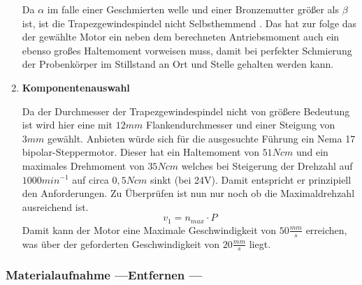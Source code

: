 \begin{enumerate}[label=(\alph*)]
    Da $\alpha$ im falle einer Geschmierten welle und einer Bronzemutter größer als $\beta$ ist, ist die Trapezgewindespindel nicht Selbsthemmend \cite{DOLDMechatronikGmbH.}. Das hat zur folge das der gewählte Motor ein neben dem berechneten Antriebsmoment auch ein ebenso großes Haltemoment vorweisen muss, damit bei perfekter Schmierung der Probenkörper im Stillstand an Ort und Stelle gehalten werden kann.
    
    \item \textbf{Komponentenauswahl}

    Da der Durchmesser der Trapezgewindespindel nicht von größere Bedeutung ist wird hier eine mit $12mm$ Flankendurchmesser und einer Steigung von $3mm$ gewählt. Anbieten würde sich für die ausgesuchte Führung ein Nema 17 bipolar-Steppermotor. Dieser hat ein Haltemoment von $51 Ncm$ und ein maximales Drehmoment von $35Ncm$ welches bei Steigerung der Drehzahl auf $1000min^{-1}$ auf circa $0,5Ncm$ sinkt (bei 24V). Damit entspricht er prinzipiell den Anforderungen. Zu Überprüfen ist nun nur noch ob die Maximaldrehzahl ausreichend ist.
    \begin{equation}
        v_1 = n_{max} \cdot P
    \end{equation}
    Damit kann der Motor eine Maximale Geschwindigkeit von $50 \frac{mm}{s}$ erreichen, was über der geforderten Geschwindigkeit von $20\frac{mm}{s}$ liegt.
    
    
    
     
    
\end{enumerate}


\subsubsection{Materialaufnahme ---Entfernen ---}
